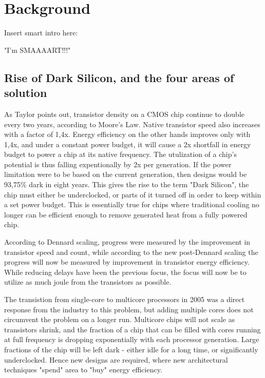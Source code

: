 \chapter{Background}
\label{cha:background}

Insert smart intro here:

"I'm SMAAAART!!!"

\section{Rise of Dark Silicon, and the four areas of solution}
\label{sec:dark-silicon}
As Taylor\cite{dark-silicon} points out, transistor density on a CMOS chip continue to double every two years, according to Moore's Law.
Native transistor speed also increases with a factor of 1,4x.
Energy efficiency on the other hands improves only with 1,4x, and under a constant power budget, it will cause a 2x shortfall in energy budget to power a chip at its native frequency.
The utulization of a chip's potential is thus falling expentionally by 2x per generation.
If the power limitation were to be based on the current generation, then designs would be 93,75\% dark in eight years.
This gives the rise to the term "Dark Silicon", the chip must either be underclocked, or parts of it turned off in order to keep within a set power budget.
This is essentially true for chips where  traditional cooling no longer can be efficient enough to remove generated heat from a fully powered chip.

According to Dennard scaling, progress were measured by the improvement in transistor speed and count, while according to the new post-Dennard scaling the progress will now be measured by improvement in transistor energy efficiency.
While reducing delays have been the previous focus, the focus will now be to utilize as much joule from the transistors as possible.

The transistion from single-core to multicore processors in 2005 was a direct response from the industry to this problem, but adding multiple cores does not circumvent the problem on a longer run.
Multicore chips will not scale as transistors shrink, and the fraction of a chip that can be filled with cores running at full frequency is dropping exponentially with each processor generation. 
Large fractions of the chip will be left dark - either idle for a long time, or significantly underclocked.
Hence new designs are required, where new architectural techniques "spend" area to "buy" energy efficiency.

